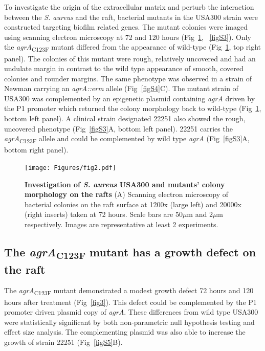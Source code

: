 \documentclass[10pt,letterpaper]{article}
\begin{document}
To investigate the origin of the extracellular matrix and perturb the interaction between the \textit{S. aureus} and the raft, bacterial mutants in the USA300 strain were constructed targeting biofilm related genes.
The mutant colonies were imaged using scanning electron microscopy at 72 and 120 hours (Fig~\ref{fig2}, ~\ref{figS3}).
Only the \textit{agrA}\textsubscript{C123F} mutant differed from the appearance of wild-type (Fig~\ref{fig2}, top right panel).
The colonies of this mutant were rough, relatively uncovered and had an undulate margin in contrast to the wild type appearance of smooth, covered colonies and rounder margins.
The same phenotype was observed in a strain of Newman carrying an \textit{agrA::erm} allele (Fig~\ref{figS4}C).
The mutant strain of USA300 was complemented by an epigenetic plasmid containing \textit{agrA} driven by the P1 promoter which returned the colony morphology back to wild-type (Fig~\ref{fig2}, bottom left panel).
A clinical strain designated 22251 also showed the rough, uncovered phenotype (Fig~\ref{figS3}A, bottom left panel).
22251 carries the \textit{agrA}\textsubscript{C123F} allele and could be complemented by wild type \textit{agrA} (Fig~\ref{figS3}A, bottom right panel).


\begin{figure}[!ht]
\begin{adjustwidth}{-2.25in}{0in}
\texttt{[image: Figures/fig2.pdf]}
\caption[Investigation of \textit{S. aureus} USA300 and mutants' colony morphology on the rafts]{
	\textbf{Investigation of \textit{S. aureus} USA300 and mutants' colony morphology on the rafts}
	(A) Scanning electron microscopy of bacterial colonies on the raft surface at 1200x (large left) and 20000x (right inserts) taken at 72 hours. Scale bars are 50$\mu$m and 2$\mu$m respectively. Images are representative at least 2 experiments.}
    \label{fig2}
    \end{adjustwidth}
\end{figure}

\subsection*{The \textit{agrA}\textsubscript{C123F} mutant has a growth defect on the raft}

The \textit{agrA}\textsubscript{C123F} mutant demonstrated a modest growth defect 72 hours and 120 hours after treatment (Fig~\ref{fig3}).
This defect could be complemented by the P1 promoter driven plasmid copy of \textit{agrA}.
These differences from wild type USA300 were statistically significant by both non-parametric null hypothesis testing and effect size analysis.
The complementing plasmid was also able to increase the growth of strain 22251 (Fig~\ref{figS5}B). 
\end{document}
